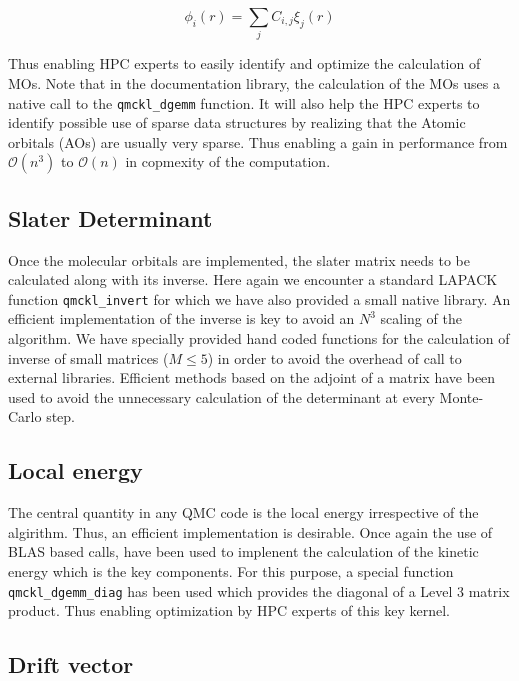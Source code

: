 \begin{equation}
  \phi_i(r) = \sum_{j}C_{i,j}\xi_j(r)
\end{equation}

Thus enabling HPC experts to easily identify and optimize the calculation
of MOs. Note that in the documentation library, the
calculation of the MOs uses a native call to the \texttt{qmckl_dgemm}
function. It will also help the HPC experts to identify possible
use of sparse data structures by realizing that the Atomic orbitals (AOs)
are usually very sparse. Thus enabling a gain in performance from $\mathcal{O}(n^3)$
to $\mathcal{O}(n)$ in copmexity of the computation.

\subsection{Slater Determinant}

Once the molecular orbitals are implemented, the slater matrix needs to be
calculated along with its inverse. Here again we encounter a standard
\ac{LAPACK} function \texttt{qmckl_invert} for which we have also
provided a small native library. An efficient implementation of the inverse is
key to avoid an $N^3$ scaling of the algorithm. We have specially provided hand
coded functions for the calculation of inverse of small matrices ($M\le 5$) in
order to avoid the overhead of call to external libraries. Efficient methods
based on the adjoint of a matrix \cite{MCMQC} have been used to avoid the
unnecessary calculation of the determinant at every Monte-Carlo step.

\subsection{Local energy}

The central quantity in any QMC code is the local energy irrespective of
the algirithm. Thus, an efficient implementation is desirable. Once again
the use of \ac{BLAS} based calls, have been used to implenent the calculation
of the kinetic energy which is the key components. For this purpose, a
special function \texttt{qmckl_dgemm_diag} has been used which
provides the diagonal of a Level 3 matrix product. Thus enabling optimization
by HPC experts of this key kernel.

\subsection{Drift vector}

